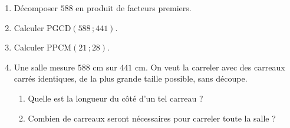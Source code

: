 \begin{enumerate}[label=\arabic*)]
\item Décomposer $588$ en produit de facteurs premiers.
\item Calculer $\text{PGCD}(588\,;441)$.
\item Calculer $\text{PPCM}(21\,;28)$.
\item Une salle mesure $588$ cm sur $441$ cm. On veut la carreler avec des carreaux carrés
identiques, de la plus grande taille possible, sans découpe.
\begin{enumerate}[label=\alph*)]
\item Quelle est la longueur du côté d'un tel carreau ?
\item Combien de carreaux seront nécessaires pour carreler toute la salle ?
\end{enumerate}
\end{enumerate}


